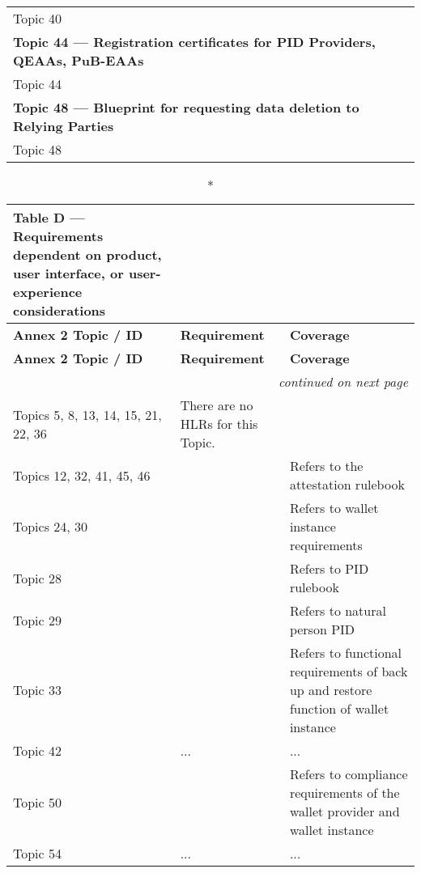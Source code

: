 \begin{landscape}
\begin{longtable}{p{3cm} p{10cm} p{7cm}}
Topic 40 &
 &
\\

\multicolumn{3}{l}{\textbf{Topic 44 — Registration certificates for PID Providers, QEAAs, PuB-EAAs}}\\

Topic 44 &
 &
\\

\multicolumn{3}{l}{\textbf{Topic 48 — Blueprint for requesting data deletion to Relying Parties}}\\

Topic 48 &
 &
\\

\end{longtable}
\end{landscape}



\clearpage
\begin{landscape}
\small
\begin{longtable}{p{3cm} p{10cm} p{7cm}}
\caption*{Table D — Requirements dependent on product, user interface, or user-experience considerations}\\
\toprule
\textbf{Annex 2 Topic / ID} & \textbf{Requirement} & \textbf{Coverage}\\
\midrule
\endfirsthead
\toprule
\textbf{Annex 2 Topic / ID} & \textbf{Requirement} & \textbf{Coverage}\\
\midrule
\endhead
\midrule
\multicolumn{3}{r}{\emph{continued on next page}}\\
\bottomrule
\endfoot
\bottomrule
\endlastfoot

Topics 5, 8, 13, 14, 15, 21, 22, 36 &
There are no HLRs for this Topic. & \\

Topics 12, 32, 41, 45, 46 &
 & Refers to the attestation rulebook \\

Topics 24, 30 &
 & Refers to wallet instance requirements \\

Topic 28 &
 & Refers to PID rulebook \\

Topic 29 &
 & Refers to natural person PID \\

Topic 33 &
 & Refers to functional requirements of back up and restore function of wallet instance \\

Topic 42 &
... & ... \\

Topic 50 &
& Refers to compliance requirements of the wallet provider and wallet instance \\

Topic 54 &
... & ... \\

\end{longtable}
\end{landscape}

